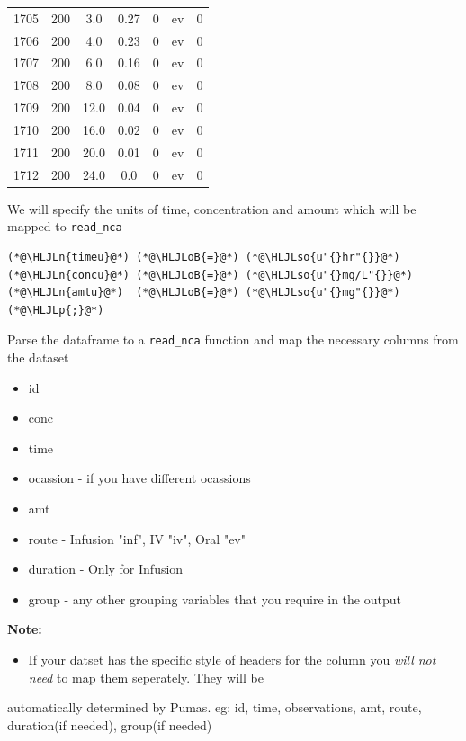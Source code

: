 \documentclass[12pt,a4paper]{article}
\newcommand{\HLJLn}[1]{#1}
\newcommand{\HLJLso}[1]{\textcolor[RGB]{201,61,57}{#1}}
\newcommand{\HLJLoB}[1]{\textcolor[RGB]{102,102,102}{\textbf{#1}}}
\newcommand{\HLJLp}[1]{#1}
\begin{document}
\begin{tabular}{r|cccccc}
	1705 & 200 & 3.0 & 0.27 & 0 & ev & 0 \\
	1706 & 200 & 4.0 & 0.23 & 0 & ev & 0 \\
	1707 & 200 & 6.0 & 0.16 & 0 & ev & 0 \\
	1708 & 200 & 8.0 & 0.08 & 0 & ev & 0 \\
	1709 & 200 & 12.0 & 0.04 & 0 & ev & 0 \\
	1710 & 200 & 16.0 & 0.02 & 0 & ev & 0 \\
	1711 & 200 & 20.0 & 0.01 & 0 & ev & 0 \\
	1712 & 200 & 24.0 & 0.0 & 0 & ev & 0 \\
\end{tabular}


We will specify the units of time, concentration and amount which will be mapped to \texttt{read\_nca}


\begin{lstlisting}
(*@\HLJLn{timeu}@*) (*@\HLJLoB{=}@*) (*@\HLJLso{u"{}hr"{}}@*)
(*@\HLJLn{concu}@*) (*@\HLJLoB{=}@*) (*@\HLJLso{u"{}mg/L"{}}@*)
(*@\HLJLn{amtu}@*)  (*@\HLJLoB{=}@*) (*@\HLJLso{u"{}mg"{}}@*)(*@\HLJLp{;}@*)
\end{lstlisting}


Parse the dataframe to a \texttt{read\_nca} function and map the necessary columns from the dataset

\begin{itemize}
\item id


\item conc


\item time


\item ocassion - if you have different ocassions


\item amt


\item route - Infusion "inf", IV "iv", Oral "ev"


\item duration - Only for Infusion


\item group - any other grouping variables that you require in the output

\end{itemize}
\textbf{Note:}

\begin{itemize}
\item If your datset has the specific style of headers for the column you \emph{will not need} to map them seperately. They will be

\end{itemize}
automatically determined by Pumas. eg: id, time, observations, amt, route, duration(if needed), group(if needed)
\end{document}
